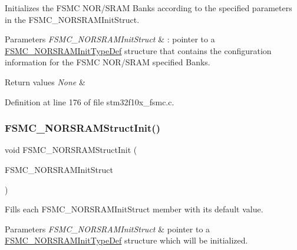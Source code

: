 Initializes the F\+S\+MC N\+O\+R/\+S\+R\+AM Banks according to the specified parameters in the F\+S\+M\+C\+\_\+\+N\+O\+R\+S\+R\+A\+M\+Init\+Struct. 


\begin{DoxyParams}{Parameters}
{\em F\+S\+M\+C\+\_\+\+N\+O\+R\+S\+R\+A\+M\+Init\+Struct} & \+: pointer to a \hyperlink{struct_f_s_m_c___n_o_r_s_r_a_m_init_type_def}{F\+S\+M\+C\+\_\+\+N\+O\+R\+S\+R\+A\+M\+Init\+Type\+Def} structure that contains the configuration information for the F\+S\+MC N\+O\+R/\+S\+R\+AM specified Banks. \\
\hline
\end{DoxyParams}

\begin{DoxyRetVals}{Return values}
{\em None} & \\
\hline
\end{DoxyRetVals}


Definition at line 176 of file stm32f10x\+\_\+fsmc.\+c.

\mbox{\label{group___f_s_m_c___exported___functions_gaf33e6dfc34f62d16a0cb416de9e83d28}} 
\subsubsection{\texorpdfstring{F\+S\+M\+C\+\_\+\+N\+O\+R\+S\+R\+A\+M\+Struct\+Init()}{FSMC\_NORSRAMStructInit()}}
{\footnotesize\ttfamily void F\+S\+M\+C\+\_\+\+N\+O\+R\+S\+R\+A\+M\+Struct\+Init (\begin{DoxyParamCaption}\item[{\hyperlink{struct_f_s_m_c___n_o_r_s_r_a_m_init_type_def}{F\+S\+M\+C\+\_\+\+N\+O\+R\+S\+R\+A\+M\+Init\+Type\+Def} $\ast$}]{F\+S\+M\+C\+\_\+\+N\+O\+R\+S\+R\+A\+M\+Init\+Struct }\end{DoxyParamCaption})}



Fills each F\+S\+M\+C\+\_\+\+N\+O\+R\+S\+R\+A\+M\+Init\+Struct member with its default value. 


\begin{DoxyParams}{Parameters}
{\em F\+S\+M\+C\+\_\+\+N\+O\+R\+S\+R\+A\+M\+Init\+Struct} & pointer to a \hyperlink{struct_f_s_m_c___n_o_r_s_r_a_m_init_type_def}{F\+S\+M\+C\+\_\+\+N\+O\+R\+S\+R\+A\+M\+Init\+Type\+Def} structure which will be initialized. \\
\hline
\end{DoxyParams}

